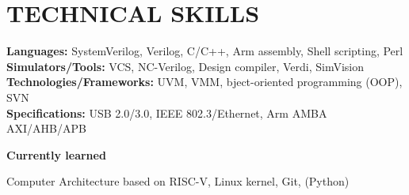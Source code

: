 \documentclass[letterpaper,11pt]{article}
\begin{document}
\section{TECHNICAL SKILLS}
 \begin{itemize}[leftmargin=0.15in, label={}]
    \small{\item{
     \textbf{\normalsize{Languages:}}{ \normalsize{SystemVerilog, Verilog, C/C++, Arm assembly, Shell scripting, Perl}} \\
     \textbf{\normalsize{Simulators/Tools:}}{ \normalsize{VCS, NC-Verilog, Design compiler, Verdi, SimVision}} \\
     \textbf{\normalsize{Technologies/Frameworks:}}{ \normalsize{UVM, VMM, bject-oriented programming (OOP), SVN}} \\
     \textbf{\normalsize{Specifications:}}{ \normalsize{USB 2.0/3.0, IEEE 802.3/Ethernet, Arm AMBA AXI/AHB/APB}} \\
    }}
 \end{itemize}
 \vspace{-4pt}
 {{\textbf{\large{Currently learned}}}}
 \vspace{-4pt}
  \begin{itemize}[leftmargin=0.15in, label={}]
    \small{\item{
     {\normalsize{Computer Architecture based on RISC-V, Linux kernel, Git, (Python)}}
    }}
 \end{itemize}
 \vspace{-14pt}
 

\end{document}
